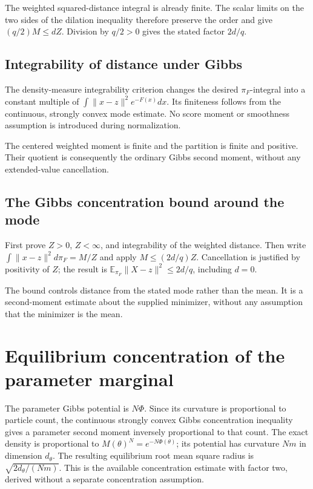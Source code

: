 \documentclass[11pt,a4paper]{article}
\begin{document}
The weighted squared-distance integral is already finite. The scalar limits on the two sides of the dilation inequality therefore preserve the order and give \((q/2)M\le dZ\). Division by \(q/2>0\) gives the stated factor \(2d/q\).


\subsection{\texorpdfstring{Integrability of distance under Gibbs}{Integrability of distance under Gibbs}}


The density-measure integrability criterion changes the desired \(\pi_F\)-integral into a constant multiple of \(\int\|x-z\|^2e^{-F(x)}dx\). Its finiteness follows from the continuous, strongly convex mode estimate. No score moment or smoothness assumption is introduced during normalization.



The centered weighted moment is finite and the partition is finite and positive. Their quotient is consequently the ordinary Gibbs second moment, without any extended-value cancellation.


\subsection{\texorpdfstring{The Gibbs concentration bound around the mode}{The Gibbs concentration bound around the mode}}


First prove \(Z>0\), \(Z<\infty\), and integrability of the weighted distance. Then write \(\int\|x-z\|^2d\pi_F=M/Z\) and apply \(M\le(2d/q)Z\). Cancellation is justified by positivity of \(Z\); the result is \(\mathbb E_{\pi_F}\|X-z\|^2\le2d/q\), including \(d=0\).



The bound controls distance from the stated mode rather than the mean. It is a second-moment estimate about the supplied minimizer, without any assumption that the minimizer is the mean.


\section{\texorpdfstring{Equilibrium concentration of the parameter marginal}{Equilibrium concentration of the parameter marginal}}


The parameter Gibbs potential is \(N\Phi\). Since its curvature is proportional to particle count, the continuous strongly convex Gibbs concentration inequality gives a parameter second moment inversely proportional to that count. The exact density is proportional to \(M(\theta)^N=e^{-N\Phi(\theta)}\); its potential has curvature \(Nm\) in dimension \(d_\theta\). The resulting equilibrium root mean square radius is \(\sqrt{2d_\theta/(Nm)}\). This is the available concentration estimate with factor two, derived without a separate concentration assumption.
\end{document}
